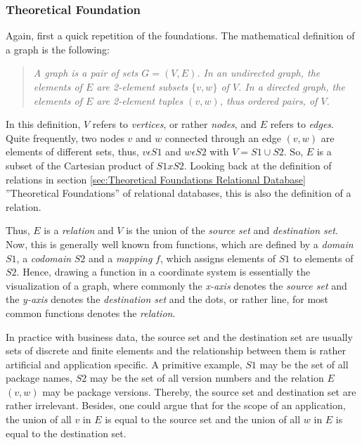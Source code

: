 \subsubsection{Theoretical Foundation} \label{sec:GraphDB Theoretical Foundation}
Again, first a quick repetition of the foundations. The mathematical definition of a graph is the following: 
\begin{quote}
	\textit{A graph is a pair of sets $G = (V,E)$. In an undirected graph, the elements of $E$ are 2-element subsets $\{v,w\}$ of $V$. In a directed graph, the elements of $E$ are 2-element tuples $(v,w)$, thus ordered pairs, of $V$.}
	\cite{IntroductionToAlgorithms}
\end{quote}
In this definition, $V$ refers to \emph{vertices}, or rather \emph{nodes}, and $E$ refers to \emph{edges}. Quite frequently, two nodes $v$ and $w$ connected through an edge $(v,w)$ are elements of different sets, thus, $v \epsilon S1$ and $w \epsilon S2$ with $V = S1 \cup S2$. So, $E$ is a subset of the Cartesian product of $S1 x S2$. Looking back at the definition of relations in section \ref{sec:Theoretical Foundations Relational Database} ''Theoretical Foundations'' of relational databases, this is also the definition of a relation.\par
Thus, $E$ is a \emph{relation} and $V$ is the union of the \emph{source set} and \emph{destination set}. Now, this is generally well known from functions, which are defined by a \emph{domain} $S1$, a \emph{codomain} $S2$ and a \emph{mapping} $f$, which assigns elements of $S1$ to elements of $S2$. Hence, drawing a function in a coordinate system is essentially the visualization of a graph, where commonly the \emph{x-axis} denotes the \emph{source set} and the \emph{y-axis} denotes the \emph{destination set} and the dots, or rather line, for most common functions denotes the \emph{relation}.\par
In practice with business data, the source set and the destination set are usually sets of discrete and finite elements and the relationship between them is rather artificial and application specific. A primitive example, $S1$ may be the set of all package names, $S2$ may be the set of all version numbers and the relation $E$ $(v, w)$ may be package versions. Thereby, the source set and destination set are rather irrelevant. Besides, one could argue that for the scope of an application, the union of all $v$ in $E$ is equal to the source set and the union of all $w$ in $E$ is equal to the destination set.

